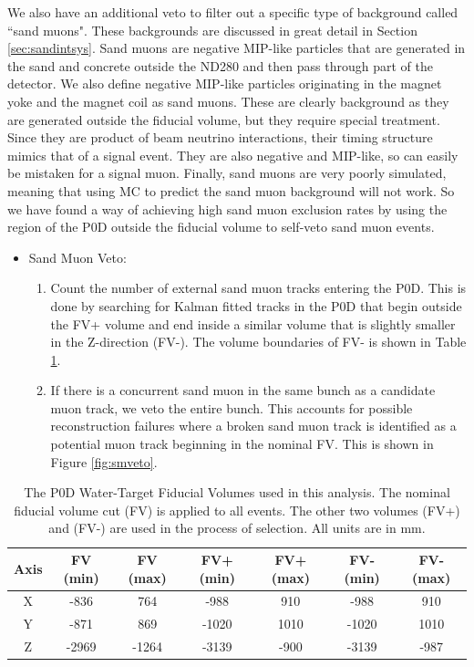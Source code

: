 We also have an additional veto to filter out a specific type of background called ``sand muons". These backgrounds are discussed in great detail in Section \ref{sec:sandintsys}. Sand muons are negative MIP-like particles that are generated in the sand and concrete outside the ND280 and then pass through part of the detector. We also define negative MIP-like particles originating in the magnet yoke and the magnet coil as sand muons. These are clearly background as they are generated outside the fiducial volume, but they require special treatment. Since they are product of beam neutrino interactions, their timing structure mimics that of a signal event. They are also negative and MIP-like, so can easily be mistaken for a signal muon. Finally, sand muons are very poorly simulated, meaning that using MC to predict the sand muon background will not work. So we have found a way of achieving high sand muon exclusion rates by using the region of the P0D outside the fiducial volume to self-veto sand muon events.

\begin{itemize}
\item Sand Muon Veto:
\begin{enumerate}
	\item Count the number of external sand muon tracks entering the P0D. This is done by searching for Kalman fitted tracks in the P0D that begin outside the FV+ volume and end inside a similar volume that is slightly smaller in the Z-direction (FV-). The volume boundaries of FV- is shown in Table \ref{tab:WTFV}.
	\item If there is a concurrent sand muon in the same bunch as a candidate muon track, we veto the entire bunch. This accounts for possible reconstruction failures where a broken sand muon track is identified as a potential muon track beginning in the nominal FV. This is shown in Figure \ref{fig:smveto}.
\end{enumerate}
\end{itemize}

\begin{table}[h]
\caption{The P0D Water-Target Fiducial Volumes used in this analysis. The nominal fiducial volume cut (FV) is applied to all events. The other two volumes (FV+) and (FV-) are used in the process of selection. All units are in mm.}
\centering
\begin{tabular}{ccccccc}
\toprule
Axis & FV (min) & FV (max) & FV+ (min) & FV+ (max) & FV- (min) & FV- (max) \\
\hline
X & -836 & 764 & -988 & 910 & -988 & 910\\
Y & -871 & 869 & -1020 & 1010 & -1020 & 1010\\
Z & -2969 & -1264 & -3139 & -900 & -3139 & -987\\
\bottomrule
\end{tabular} 
\label{tab:WTFV} 
\end{table}

